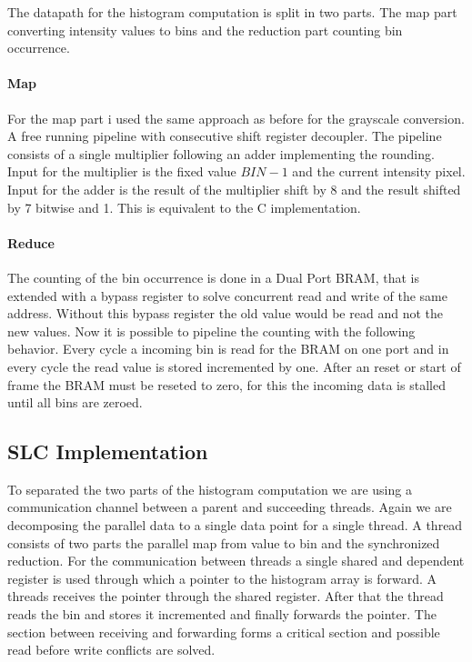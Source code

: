 \documentclass[a4paper,fontsize=12pt]{scrartcl}
\begin{document}
The datapath for the histogram computation is split in two parts. The map part converting intensity values to bins and the reduction part counting bin occurrence. 

\paragraph{Map}

For the map part i used the same approach as before for the grayscale conversion. A free running pipeline with consecutive shift register decoupler. The pipeline consists of a single multiplier following an adder implementing the rounding. Input for the multiplier is the fixed value $BIN-1$ and the current intensity pixel. Input for the adder is the result of the multiplier shift by 8 and the result shifted by 7 bitwise and 1. This is equivalent to the C implementation. 

\paragraph{Reduce}

The counting of the bin occurrence is done in a Dual Port BRAM, that is extended with a bypass register to solve concurrent read and write of the same address. Without this bypass register the old value would be read and not the new values. Now it is possible to pipeline the counting with the following behavior. Every cycle a incoming bin is read for the BRAM on one port and in every cycle the read value is stored incremented by one. After an reset or start of frame the BRAM must be reseted to zero, for this the incoming data is stalled until all bins are zeroed.


\subsection{SLC Implementation}
To separated the two parts of the histogram computation we are using a communication channel between a parent and succeeding threads. Again we are decomposing the parallel data to a single data point for a single thread. A thread consists of two parts the parallel map from value to bin and the synchronized reduction. For the communication between threads a single shared and dependent register is used through which a pointer to the histogram array is forward. A threads receives the pointer through the shared register. After that the thread reads the bin and stores it incremented and finally forwards the pointer. The section between receiving and forwarding forms a critical section and possible read before write conflicts are solved.
\end{document}
